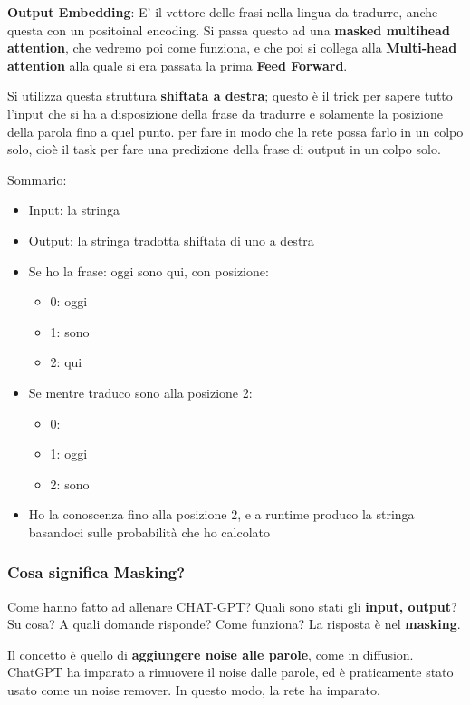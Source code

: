 \textbf{Output Embedding}: E' il vettore delle frasi nella lingua da tradurre, anche questa con un positoinal encoding. Si passa questo ad una \textbf{masked multihead attention}, che vedremo poi come funziona, e che poi si collega alla \textbf{Multi-head attention} alla quale 
si era passata la prima \textbf{Feed Forward}.

Si utilizza questa struttura \textbf{shiftata a destra}; questo è il trick per sapere tutto l'input che si ha a disposizione della frase da tradurre e solamente la posizione della parola fino a quel punto.
per fare in modo che la rete possa farlo in un colpo solo, cioè il task per fare una predizione della frase di output in un colpo solo. 


Sommario: 
\begin{itemize}
    \item Input: la stringa
    \item Output: la stringa tradotta shiftata di uno a destra
    \item Se ho la frase: oggi sono qui, con posizione: 
    \begin{itemize}
        \item 0: oggi
        \item 1: sono
        \item 2: qui
    \end{itemize}
    \item Se mentre traduco sono alla posizione 2:
    \begin{itemize}
        \item 0: $\_$
        \item 1: oggi
        \item 2: sono
    \end{itemize}
    \item Ho la conoscenza fino alla posizione 2, e a runtime produco la stringa basandoci sulle probabilità che ho calcolato
\end{itemize}

\subsubsection{Cosa significa Masking?}

Come hanno fatto ad allenare CHAT-GPT? Quali sono stati gli \textbf{input, output}? Su cosa? A quali domande risponde? Come funziona? La risposta è nel \textbf{masking}.

Il concetto è quello di \textbf{aggiungere noise alle parole}, come in diffusion. ChatGPT ha imparato a rimuovere 
il noise dalle parole, ed è praticamente stato usato come un noise remover. In questo modo, la rete ha imparato.

\newpage
